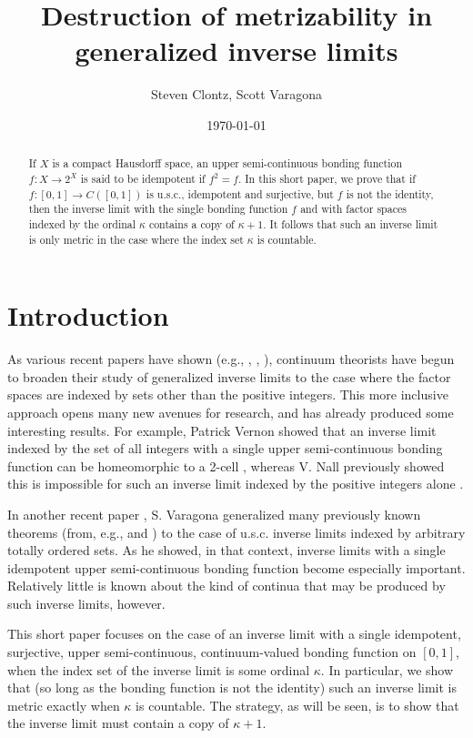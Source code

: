 \documentclass{amsart}
\title{Destruction of metrizability in generalized inverse limits}
\author{Steven Clontz, Scott Varagona}
\date{\today}
\theoremstyle{definition}
\newcommand{\<}{\langle}
\renewcommand{\>}{\rangle}
\begin{document}
\begin{abstract}
If $X$ is a compact Hausdorff space, an upper semi-continuous bonding function $f: X \rightarrow 2^{X}$ is said to be idempotent if $f^2 = f$. In this short paper, we prove that if $f: [0,1] \rightarrow C([0,1])$ is u.s.c., idempotent and surjective, but $f$ is not the identity, then the inverse limit with the single bonding function $f$ and with factor spaces indexed by the ordinal $\kappa$ contains a copy of $\kappa + 1$. It follows that such an inverse limit is only metric in the case where the index set $\kappa$ is countable.
\end{abstract}

\maketitle

\section{Introduction}

As various recent papers have shown (e.g., \cite{char roe}, \cite{varagona}, \cite{vernon}), continuum theorists have begun to broaden their study of generalized inverse limits to the case where the factor spaces are indexed by sets other than the positive integers. This more inclusive approach opens many new avenues for research, and has already produced some interesting results. For example, Patrick Vernon showed that an inverse limit indexed by the set of all integers with a single upper semi-continuous bonding function can be homeomorphic to a 2-cell \cite{vernon}, whereas V. Nall previously showed this is impossible for such an inverse limit indexed by the positive integers alone \cite{nall 2cell}.

In another recent paper \cite{varagona}, S. Varagona generalized many previously known theorems (from, e.g., \cite{ingram mahavier} and \cite{nall connected}) to the case of u.s.c. inverse limits indexed by arbitrary totally ordered sets. As he showed, in that context, inverse limits with a single idempotent upper semi-continuous bonding function become especially important. Relatively little is known about the kind of continua that may be produced by such inverse limits, however.

This short paper focuses on the case of an inverse limit with a single idempotent, surjective, upper semi-continuous, continuum-valued bonding function on $[0,1]$, when the index set of the inverse limit is some ordinal $\kappa$. In particular, we show that (so long as the bonding function is not the identity) such an inverse limit is metric exactly when $\kappa$ is countable. The strategy, as will be seen, is to show that the inverse limit must contain a copy of $\kappa + 1$.
\end{document}
